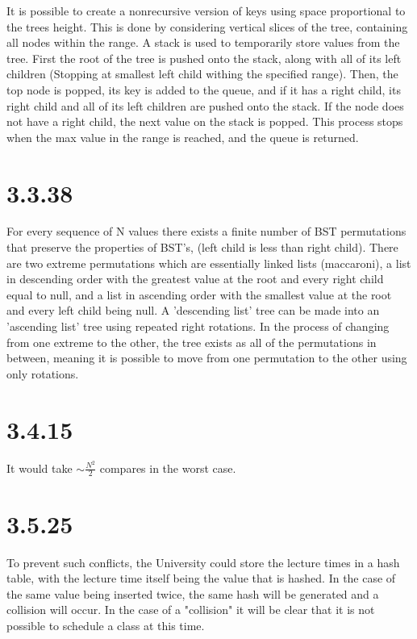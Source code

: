 \documentclass[12pt]{article}
\begin{document}
It is possible to create a nonrecursive version of keys using space proportional
to the trees height. This is done by considering vertical slices of the tree,
containing all nodes within the range. A stack is used to temporarily store
values from the tree. First the root of the tree is pushed onto the stack,
along with all of its left children (Stopping at smallest left child
withing the specified range). Then, the top node is popped, its key is added
to the queue, and if it has a right child, its right child and all of its 
left children are pushed onto the stack. If the node does not have a right
child, the next value on the stack is popped. This process stops when the max
value in the range is reached, and the queue is returned.

\section*{3.3.38}

For every sequence of N values there exists a finite number of BST permutations
that preserve the properties of BST's, (left child is less than right child).
There are two extreme permutations which are essentially linked lists (maccaroni),
a list in descending order with the greatest value at the root and every right
child equal to null, and a list in ascending order with the smallest value at
the root and every left child being null. A 'descending list' tree can be 
made into an 'ascending list' tree using repeated right rotations. In the 
process of changing from one extreme to the other, the tree exists as all
of the permutations in between, meaning it is possible to move from one
permutation to the other using only rotations.

\section*{3.4.15}

It would take  $\sim \frac{N^2}{2}$ compares in the worst case.

\section*{3.5.25}

To prevent such conflicts, the University could store the lecture times
in a hash table, with the lecture time itself being the value that is hashed.
In the case of the same value being inserted twice, the same hash will be generated
and a collision will occur. In the case of a "collision" it will be clear that
it is not possible to schedule a class at this time.
\end{document}
